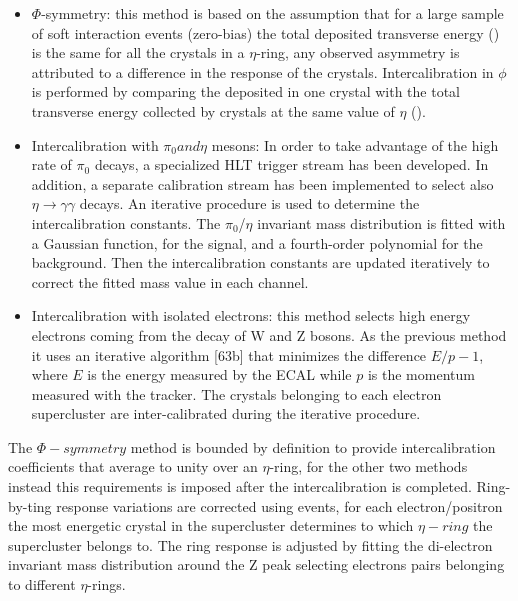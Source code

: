 \begin{itemize}
\item $\Phi$-symmetry: this method is based on the assumption that for a large sample of soft interaction
events (zero-bias) the total deposited transverse energy (\sumEt) is the same for all the crystals in a
$\eta$-ring, any observed asymmetry is attributed to a difference in the response of the crystals.
Intercalibration in $\phi$ is performed by comparing the \sumEt deposited in one crystal
with the total transverse energy collected by crystals at the same value of $\eta$ (\sumEtring).

\item Intercalibration with $\pi_0 and \eta$ mesons:
  In order to take advantage of the high rate of $\pi_0$ decays, a specialized HLT trigger stream has
been developed. In addition, a separate calibration stream has been implemented to select also
$\eta\to\gamma\gamma$ decays. An iterative procedure is used to determine the intercalibration constants.
The $\pi_0$/$\eta$ invariant mass distribution is fitted with a Gaussian function, for the signal, and a
fourth-order polynomial for the background. Then the intercalibration constants are updated
iteratively to correct the fitted mass value in each channel.

\item Intercalibration with isolated electrons: this method selects high energy electrons coming from the decay of
  W and Z bosons. As the previous method it uses an iterative algorithm [63b] that minimizes the difference $E/p - 1$,
  where $E$ is the energy measured by the ECAL while $p$ is the momentum measured with the tracker.
  The crystals belonging to each electron supercluster are inter-calibrated during the iterative procedure.
\end{itemize}

The $\Phi-symmetry$ method is bounded by definition to provide intercalibration coefficients that average to unity
over an $\eta$-ring, for the other two methods instead this requirements is imposed after the intercalibration is completed.
Ring-by-ting response variations are corrected using \Zee events, for each electron/positron the most energetic crystal in the
supercluster determines to which $\eta-ring$ the supercluster belongs to. The ring response is adjusted by fitting the di-electron
invariant mass distribution around the Z peak selecting electrons pairs belonging to different $\eta$-rings.


